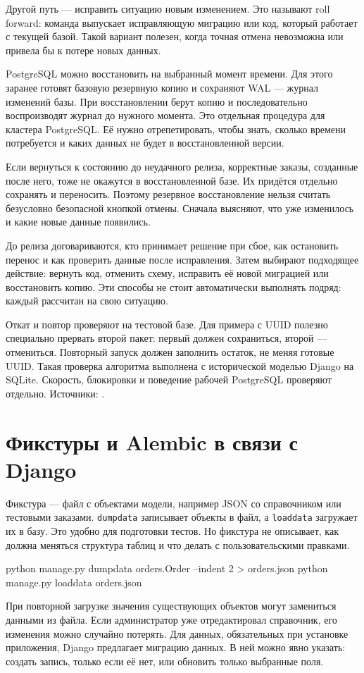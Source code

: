 \documentclass[11pt,a4paper]{article}
\newcommand{\src}[1]{{\small\color{muted}Источники: #1.}}
\newcommand{\parthead}[1]{\Needspace{10\baselineskip}\section{#1}}
\begin{document}
Другой путь --- исправить ситуацию новым изменением. Это называют roll forward: команда выпускает исправляющую миграцию или код, который работает с текущей базой. Такой вариант полезен, когда точная отмена невозможна или привела бы к потере новых данных.

PostgreSQL можно восстановить на выбранный момент времени. Для этого заранее готовят базовую резервную копию и сохраняют WAL --- журнал изменений базы. При восстановлении берут копию и последовательно воспроизводят журнал до нужного момента. Это отдельная процедура для кластера PostgreSQL. Её нужно отрепетировать, чтобы знать, сколько времени потребуется и каких данных не будет в восстановленной версии.

Если вернуться к состоянию до неудачного релиза, корректные заказы, созданные после него, тоже не окажутся в восстановленной базе. Их придётся отдельно сохранять и переносить. Поэтому резервное восстановление нельзя считать безусловно безопасной кнопкой отмены. Сначала выясняют, что уже изменилось и какие новые данные появились.

До релиза договариваются, кто принимает решение при сбое, как остановить перенос и как проверить данные после исправления. Затем выбирают подходящее действие: вернуть код, отменить схему, исправить её новой миграцией или восстановить копию. Эти способы не стоит автоматически выполнять подряд: каждый рассчитан на свою ситуацию.

Откат и повтор проверяют на тестовой базе. Для примера с UUID полезно специально прервать второй пакет: первый должен сохраниться, второй --- отмениться. Повторный запуск должен заполнить остаток, не меняя готовые UUID. Такая проверка алгоритма выполнена с исторической моделью Django на SQLite. Скорость, блокировки и поведение рабочей PostgreSQL проверяют отдельно.
\src{\cite{operations,transactions,pgpitr,alembiccookbook}}

\parthead{Фикстуры и Alembic в связи с Django}

Фикстура --- файл с объектами модели, например JSON со справочником или тестовыми заказами. \texttt{dumpdata} записывает объекты в файл, а \texttt{loaddata} загружает их в базу. Это удобно для подготовки тестов. Но фикстура не описывает, как должна меняться структура таблиц и что делать с пользовательскими правками.
\begin{code}
python manage.py dumpdata orders.Order --indent 2 > orders.json
python manage.py loaddata orders.json
\end{code}
При повторной загрузке значения существующих объектов могут замениться данными из файла. Если администратор уже отредактировал справочник, его изменения можно случайно потерять. Для данных, обязательных при установке приложения, Django предлагает миграцию данных. В ней можно явно указать: создать запись, только если её нет, или обновить только выбранные поля.
\end{document}
